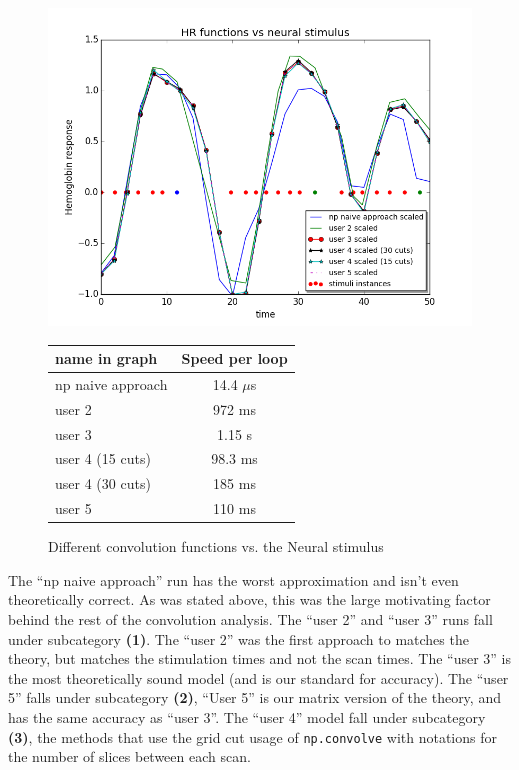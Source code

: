 \begin{figure}[ht]
\centering
	\begin{minipage}[b]{0.45\linewidth}
		\centering
		\includegraphics[width=.8\linewidth]{images/convolution_vs_neural_stimulus}  
		\caption{\scriptsize{Different convolution functions vs. the Neural stimulus}}
		\label{fig:convolution}

	\end{minipage}
\quad
	\begin{minipage}[b]{0.45\linewidth}
		\centering
		\begin{tabular}{|l | c|}
		\hline
		name in graph       & Speed per loop \\
		\hline
		np naive approach & 14.4 $\mu$s  \\
		user 2     		    & 972 ms  \\
		user 3     		    & 1.15 s    \\
		user 4 (15 cuts)      & 98.3 ms \\
		user 4 (30 cuts)      & 185 ms  \\
		user 5     	 	    & 110 ms   \\
		\hline
		\end{tabular}
		\vspace{5mm}
		\label{tab:convolution}
	\end{minipage}
\end{figure}

The ``np naive approach'' run has the worst approximation and isn't even 
theoretically correct. As was stated above, this was the large motivating factor 
behind the rest of the convolution analysis. The ``user 2'' and ``user 3'' runs fall 
under subcategory \textbf{(1)}. The ``user 2'' was the first approach to
matches the theory, but matches the stimulation times and not the scan times.
The ``user 3'' is the most theoretically sound model (and is our standard for 
accuracy). The ``user 5'' falls under subcategory \textbf{(2)}, ``User 5''  is our 
matrix version of the theory, and has the same accuracy as ``user 3''. The 
``user 4'' model fall under subcategory \textbf{(3)}, the methods that use the 
grid cut usage of \texttt{np.convolve} with notations for the number of slices 
between each scan.

